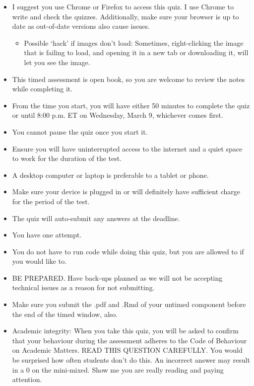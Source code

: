 \documentclass[
  openany]{book}
\providecommand{\tightlist}{%
  \setlength{\itemsep}{0pt}\setlength{\parskip}{0pt}}
\begin{document}
\begin{itemize}
\item
  I suggest you use Chrome or Firefox to access this quiz. I use Chrome to write and check the quizzes. Additionally, make sure your browser is up to date as out-of-date versions also cause issues.

  \begin{itemize}
  \tightlist
  \item
    Possible `hack' if images don't load: Sometimes, right-clicking the image that is failing to load, and opening it in a new tab or downloading it, will let you see the image.
  \end{itemize}
\item
  This timed assessment is open book, so you are welcome to review the notes while completing it.
\item
  From the time you start, you will have either 50 minutes to complete the quiz or until 8:00 p.m. ET on Wednesday, March 9, whichever comes first.
\item
  You cannot pause the quiz once you start it.
\item
  Ensure you will have uninterrupted access to the internet and a quiet space to work for the duration of the test.
\item
  A desktop computer or laptop is preferable to a tablet or phone.
\item
  Make sure your device is plugged in or will definitely have sufficient charge for the period of the test.
\item
  The quiz will auto-submit any answers at the deadline.
\item
  You have one attempt.
\item
  You do not have to run code while doing this quiz, but you are allowed to if you would like to.
\item
  BE PREPARED. Have back-ups planned as we will not be accepting technical issues as a reason for not submitting.
\item
  Make sure you submit the .pdf and .Rmd of your untimed component before the end of the timed window, also.
\item
  Academic integrity: When you take this quiz, you will be asked to confirm that your behaviour during the assessment adheres to the Code of Behaviour on Academic Matters. READ THIS QUESTION CAREFULLY. You would be surprised how often students don't do this. An incorrect answer may result in a 0 on the mini-mixed. Show me you are really reading and paying attention.
\end{itemize}
\end{document}
